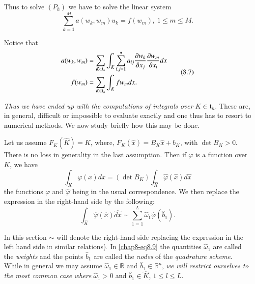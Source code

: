 Thus to solve $(P_{h})$ we have to solve the linear system
\begin{equation*}
\sum^{M}_{k=1}a(w_{k},w_{m})u_{k}=f(w_{m}),\ 1\leq m\leq
M.\tag{8.6}\label{chap8-eq8.6} 
\end{equation*}\pageoriginale

Notice that
\begin{equation*}
\begin{split}
a(w_{k},w_{m}) &=
\sum_{K\in\mathfrak{t}_{h}}\int_{K}\sum^{n}_{i,j=1}a_{ij}\frac{\partial
  w_{k}}{\partial x_{j}}\frac{\partial w_{m}}{\partial x_{i}}dx\\
f(w_{m}) &= \sum_{K\in\mathfrak{t}_{h}}\int_{K}fw_{m}dx.
\end{split}\tag{8.7}\label{chap8-eq8.7}
\end{equation*}

{\em Thus we have ended up with the computations of integrals over}
$K\in\mathfrak{t}_{h}$. These are, in general, difficult or impossible
to evaluate exactly and one thus has to resort to numerical
methods. We now study briefly how this may be done.

Let us assume $F_{K}(\hat{K})=K$, where,
$F_{K}(\hat{x})=B_{K}\hat{x}+b_{K}$, with $\det B_{K}>0$. There is no
loss in generality in the last assumption. Then if $\varphi$ is a
function over $K$, we have
\begin{equation*}
\int_{K}\varphi(x)dx=(\det
B_{K})\int_{\hat{K}}\hat{\varphi}(\hat{x})d\hat{x}\tag{8.8}\label{chap8-eq8.8} 
\end{equation*}
the functions $\varphi$ and $\hat{\varphi}$ being in the usual
correspondence. We then replace the expression in the right-hand side
by the following:
\begin{equation*}
\int_{\hat{K}}\hat{\varphi}(\hat{x})\widehat{dx}\sim \sum^{L}_{1=1}\hat{\omega}_{1}\hat{\varphi}(\hat{b}_{1}).\tag{8.9}\label{chap8-eq8.9}
\end{equation*}

In this section $\sim$ will denote the right-hand side replacing the
expression in the left hand side in similar relations). In
\eqref{chap8-eq8.9} the quantities $\hat{\omega}_{1}$ are called the
      {\em weights} and the points $\hat{b}_{1}$ are called the {\em
        nodes} of the {\em quadrature scheme}. While in general we may
      assume $\hat{\omega}_{1}\in \mathbb{R}$ and
      $\hat{b}_{1}\in\mathbb{R}^{n}$, {\em we will restrict ourselves
        to the most common case where} $\hat{\omega}_{1}>0$ and
      $\hat{b}_{1}\in\hat{K}$, $1\leq l\leq L$.

